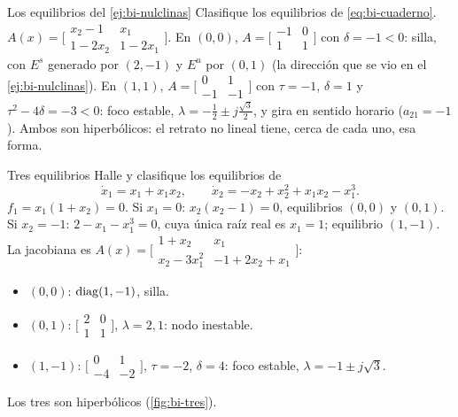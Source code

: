 \begin{ejemplo}[label=ej:bi-cuadernoeq]{Los equilibrios del \cref{ej:bi-nulclinas}}
Clasifique los equilibrios de \eqref{eq:bi-cuaderno}.
\solucion $A(x)=\bigl[\begin{smallmatrix}x_2-1&x_1\\1-2x_2&1-2x_1\end{smallmatrix}\bigr]$. En $(0,0)$, $A=\bigl[\begin{smallmatrix}-1&0\\1&1\end{smallmatrix}\bigr]$ con $\delta=-1<0$: silla, con $E^s$ generado por $(2,-1)$ y $E^u$ por $(0,1)$ (la dirección que se vio en el \cref{ej:bi-nulclinas}). En $(1,1)$, $A=\bigl[\begin{smallmatrix}0&1\\-1&-1\end{smallmatrix}\bigr]$ con $\tau=-1$, $\delta=1$ y $\tau^2-4\delta=-3<0$: foco estable, $\lambda=-\tfrac12\pm j\tfrac{\sqrt3}2$, y gira en sentido horario ($a_{21}=-1$). Ambos son hiperbólicos: el retrato no lineal tiene, cerca de cada uno, esa forma.
\end{ejemplo}

\begin{ejemplo}[label=ej:bi-tres]{Tres equilibrios}
Halle y clasifique los equilibrios de
\begin{equation}
  \dot x_1=x_1+x_1x_2,\qquad \dot x_2=-x_2+x_2^2+x_1x_2-x_1^3 .
  \label{eq:bi-tres}
\end{equation}
\solucion $f_1=x_1(1+x_2)=0$. Si $x_1=0$: $x_2(x_2-1)=0$, equilibrios $(0,0)$ y $(0,1)$. Si $x_2=-1$: $2-x_1-x_1^3=0$, cuya única raíz real es $x_1=1$; equilibrio $(1,-1)$. La jacobiana es $A(x)=\bigl[\begin{smallmatrix}1+x_2&x_1\\x_2-3x_1^2&-1+2x_2+x_1\end{smallmatrix}\bigr]$:
\begin{itemize}
  \item $(0,0)$: $\operatorname{diag}(1,-1)$, silla.
  \item $(0,1)$: $\bigl[\begin{smallmatrix}2&0\\1&1\end{smallmatrix}\bigr]$, $\lambda=2,1$: nodo inestable.
  \item $(1,-1)$: $\bigl[\begin{smallmatrix}0&1\\-4&-2\end{smallmatrix}\bigr]$, $\tau=-2$, $\delta=4$: foco estable, $\lambda=-1\pm j\sqrt3$.
\end{itemize}
Los tres son hiperbólicos (\cref{fig:bi-tres}).
\end{ejemplo}

